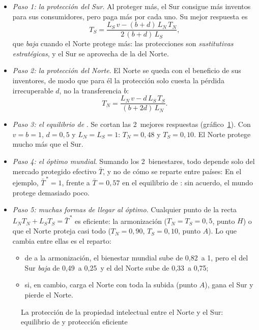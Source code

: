 \documentclass[11pt]{article}
\begin{document}
\begin{itemize}
\item \emph{Paso 1: la protección del Sur}. Al proteger más, el Sur consigue más inventos para sus consumidores, pero paga más por cada uno. Su mejor respuesta es
  \[T_S=\frac{L_S\,v-(b+d)\,L_N\,T_N}{2\,(b+d)\,L_S},\]
  que \emph{baja} cuando el Norte protege más: las protecciones son \emph{sustitutivas estratégicas}, y el Sur se aprovecha de la del Norte.
\item \emph{Paso 2: la protección del Norte}. El Norte se queda con el beneficio de sus inventores, de modo que para él la protección solo cuesta la pérdida irrecuperable $d$, no la transferencia $b$:
  \[T_N=\frac{L_N\,v-d\,L_S\,T_S}{(b+2d)\,L_N}.\]
\item \emph{Paso 3: el equilibrio de }. Se cortan las 2~mejores respuestas (gráfico~\ref{fig:grossman-lai}). Con $v=b=1$, $d=0{,}5$ y $L_N=L_S=1$: $T_N=0{,}48$ y $T_S=0{,}10$. El Norte protege mucho más que el Sur.
\item \emph{Paso 4: el óptimo mundial}. Sumando los 2~bienestares, todo depende solo del mercado protegido efectivo $\bar T$, y no de cómo se reparte entre países:
  En el ejemplo, $\bar T^{\,*}=1$, frente a $\bar T=0{,}57$ en el equilibrio de : sin acuerdo, el mundo protege demasiado poco.
\item \emph{Paso 5: muchas formas de llegar al óptimo}. Cualquier punto de la recta $L_NT_N+L_ST_S=\bar T^{\,*}$ es eficiente: la armonización ($T_N=T_S=0{,}5$, punto $H$) o que el Norte proteja casi todo ($T_N=0{,}90$, $T_S=0{,}10$, punto $A$). Lo que cambia entre ellas es el reparto:
  \begin{itemize}
  \item de  a la armonización, el bienestar mundial sube de 0,82~a 1, pero el del Sur \emph{baja} de 0,49~a 0,25~y el del Norte sube de 0,33~a 0,75;
  \item si, en cambio, carga el Norte con toda la subida (punto $A$), gana el Sur y pierde el Norte.
  \end{itemize}
\end{itemize}

\begin{figure}[H]
\centering
\caption{La protección de la propiedad intelectual entre el Norte y el Sur: equilibrio de  y protección eficiente}\label{fig:grossman-lai}
\end{figure}
\end{document}
